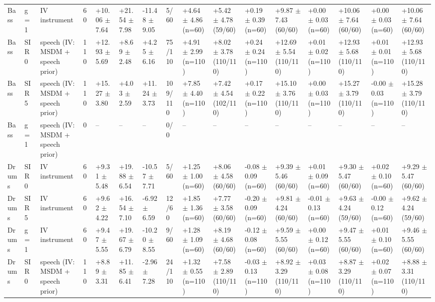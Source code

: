 \begin{tabular}{llllllllllllllll}
Bass & g = 1 & IV instrument & 60 & +10.06 $\pm$ 7.64 & +21.54 $\pm$ 7.98 & -11.48 $\pm$ 9.05 & 5/60 & +4.64 $\pm$ 4.86 (n=60) & +5.42 $\pm$ 4.78 (59/60) & +0.19 $\pm$ 0.39 (n=60) & +9.87 $\pm$ 7.43 (60/60) & +0.00 $\pm$ 0.03 (n=60) & +10.06 $\pm$ 7.64 (60/60) & +0.00 $\pm$ 0.03 (n=60) & +10.06 $\pm$ 7.64 (60/60)\\
Bass & SIR 0 & speech (IV: MSDM + speech prior) & 110 & +12.93 $\pm$ 5.69 & +8.69 $\pm$ 2.48 & +4.25 $\pm$ 6.16 & 75/110 & +4.91 $\pm$ 2.99 (n=110) & +8.02 $\pm$ 3.78 (110/110) & +0.24 $\pm$ 0.24 (n=110) & +12.69 $\pm$ 5.54 (110/110) & +0.01 $\pm$ 0.02 (n=110) & +12.93 $\pm$ 5.68 (110/110) & +0.01 $\pm$ 0.01 (n=110) & +12.93 $\pm$ 5.68 (110/110)\\
Bass & SIR 5 & speech (IV: MSDM + speech prior) & 110 & +15.27 $\pm$ 3.80 & +4.03 $\pm$ 2.59 & +11.24 $\pm$ 3.73 & 109/110 & +7.85 $\pm$ 4.40 (n=110) & +7.42 $\pm$ 4.54 (102/110) & +0.17 $\pm$ 0.22 (n=110) & +15.10 $\pm$ 3.76 (110/110) & +0.00 $\pm$ 0.03 (n=110) & +15.27 $\pm$ 3.79 (110/110) & -0.00 $\pm$ 0.03 (n=110) & +15.28 $\pm$ 3.79 (110/110)\\
Bass & g = 1 & speech (IV: MSDM + speech prior) & 0 & -- & -- & -- & 0/0 & -- & -- & -- & -- & -- & -- & -- & --\\
Drums & SIR 0 & IV instrument & 60 & +9.31 $\pm$ 5.48 & +19.88 $\pm$ 6.54 & -10.57 $\pm$ 7.71 & 5/60 & +1.25 $\pm$ 1.00 (n=60) & +8.06 $\pm$ 4.58 (60/60) & -0.08 $\pm$ 0.09 (n=60) & +9.39 $\pm$ 5.46 (60/60) & +0.01 $\pm$ 0.09 (n=60) & +9.30 $\pm$ 5.47 (60/60) & +0.02 $\pm$ 0.10 (n=60) & +9.29 $\pm$ 5.47 (60/60)\\
Drums & SIR 5 & IV instrument & 60 & +9.62 $\pm$ 4.22 & +16.54 $\pm$ 7.10 & -6.92 $\pm$ 6.59 & 12/60 & +1.85 $\pm$ 1.36 (n=60) & +7.77 $\pm$ 3.58 (60/60) & -0.20 $\pm$ 0.09 (n=60) & +9.81 $\pm$ 4.24 (60/60) & -0.01 $\pm$ 0.13 (n=60) & +9.63 $\pm$ 4.24 (59/60) & -0.00 $\pm$ 0.12 (n=60) & +9.62 $\pm$ 4.24 (59/60)\\
Drums & g = 1 & IV instrument & 60 & +9.47 $\pm$ 5.55 & +19.67 $\pm$ 6.79 & -10.20 $\pm$ 8.55 & 9/60 & +1.28 $\pm$ 1.09 (n=60) & +8.19 $\pm$ 4.68 (60/60) & -0.12 $\pm$ 0.08 (n=60) & +9.59 $\pm$ 5.55 (60/60) & +0.00 $\pm$ 0.12 (n=60) & +9.47 $\pm$ 5.55 (60/60) & +0.01 $\pm$ 0.10 (n=60) & +9.46 $\pm$ 5.55 (60/60)\\
Drums & SIR 0 & speech (IV: MSDM + speech prior) & 110 & +8.89 $\pm$ 3.31 & +11.85 $\pm$ 6.41 & -2.96 $\pm$ 7.28 & 24/110 & +1.32 $\pm$ 0.55 (n=110) & +7.58 $\pm$ 2.89 (110/110) & -0.03 $\pm$ 0.13 (n=110) & +8.92 $\pm$ 3.29 (110/110) & +0.03 $\pm$ 0.08 (n=110) & +8.87 $\pm$ 3.29 (110/110) & +0.02 $\pm$ 0.07 (n=110) & +8.88 $\pm$ 3.31 (110/110)\\

\end{tabular}

